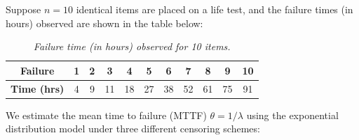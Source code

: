 \documentclass[twoside]{book}
\begin{document}
Suppose $n = 10$ identical items are placed on a life test, and the failure times (in hours) observed are shown in the table below:

\begin{table}[H]
\centering
\begin{tabular}{c|cccccccccc}
\toprule
\textbf{Failure} & 1 & 2 & 3 & 4 & 5 & 6 & 7 & 8 & 9 & 10\\
\midrule
\textbf{Time (hrs)} & 4 & 9 & 11 & 18 & 27 & 38 & 52 & 61 & 75 & 91 \\
\bottomrule
\end{tabular}
\caption{\textit{Failure time (in hours) observed for 10 items.}}
\end{table}

We estimate the mean time to failure (MTTF) $\theta = 1/\lambda$ using the exponential distribution model under three different censoring schemes:
\end{document}

